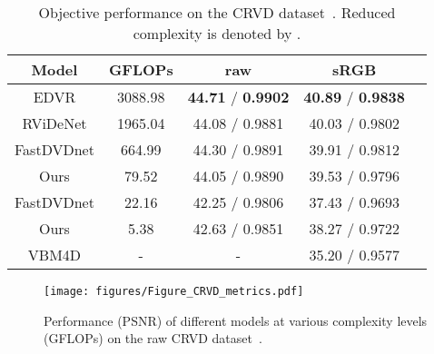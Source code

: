 \documentclass[final]{cvpr}
\begin{document}
    \begin{table}[t!]
        \centering
        \small
        \begin{tabular}{ccccc}
            \hline  

            Model                     & GFLOPs      & raw                               & sRGB                               \\
            \hline\hline
            EDVR                      & 3088.98     &\textbf{44.71} / \textbf{0.9902 }  & \textbf{40.89} / \textbf{0.9838}   \\
 
            RViDeNet                  & 1965.04     & 44.08 / 0.9881                    & 40.03 / 0.9802                     \\
            FastDVDnet                & 664.99      & 44.30 / 0.9891                    & 39.91 / 0.9812                     \\
            Ours                      & 79.52       & 44.05 / 0.9890                    & 39.53 / 0.9796                     \\
            \hline

            FastDVDnet      & 22.16       & 42.25 / 0.9806                    & 37.43 / 0.9693                     \\
            
            \rowcolor{LightYellow}
            Ours                      & 5.38        & 42.63 / 0.9851                    & 38.27 / 0.9722                     \\
            VBM4D                     & -           & -                                 & 35.20 / 0.9577                     \\
            \hline 
        \end{tabular}
        \caption{Objective performance on the CRVD dataset~\cite{yue2020supervised}. Reduced complexity is denoted by .}
        \label{tab:CRVD}
    \end{table}
    
    \begin{figure}[ht!]
        \centering
        \texttt{[image: figures/Figure\_CRVD\_metrics.pdf]}
        \vspace{-0.25cm}
        \caption{Performance (PSNR) of different models at various complexity levels (GFLOPs) on the raw CRVD dataset~\cite{yue2020supervised}.}
        \vspace{-0.15cm}
        \label{fig:psnr_gflop} 
    \end{figure}
\end{document}
